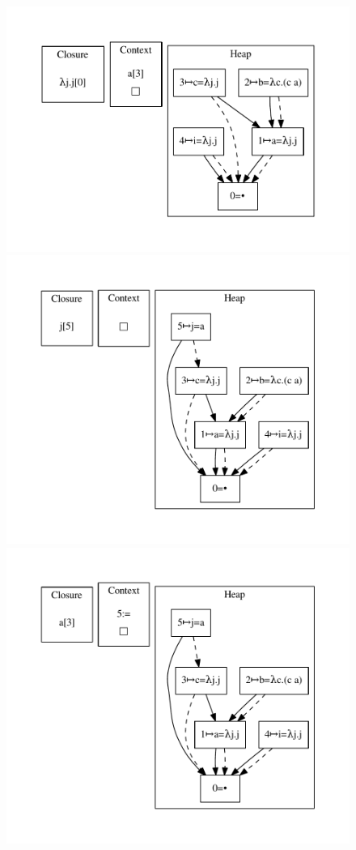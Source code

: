 \begin{figure}
\includegraphics[width=\linewidth/3]{figures/18.pdf}
\includegraphics[width=\linewidth/3]{figures/19.pdf}
\includegraphics[width=\linewidth/3]{figures/20.pdf}

\end{figure}

